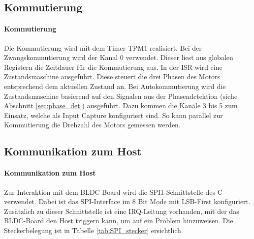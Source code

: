 \ifSTANDALONE
\subsection{Kommutierung}
\fi
\ifEMBED
\paragraph{Kommutierung}$~~$\vspace{2mm}\\
\fi
Die Kommutierung wird mit dem Timer TPM1 realisiert. Bei der 
Zwangskommutierung wird der Kanal 0 verwendet. Dieser liest aus globalen 
Registern die Zeitdauer für die Kommutierung aus. In der ISR wird eine 
Zustandsmaschine ausgeführt. Diese steuert die drei Phasen des Motors 
entsprechend dem aktuellen Zustand an. Bei Autokommutierung wird die 
Zustandsmaschine basierend auf den Signalen aus der Phasendetektion (siehe 
Abschnitt \ref{sec:phase_det}) ausgeführt. Dazu kommen die Kanäle 3 bis 5 zum 
Einsatz, welche als Input Capture konfiguriert sind. So kann parallel zur 
Kommutierung die Drehzahl des Motors gemessen werden. 

\ifSTANDALONE
\subsection{Kommunikation zum Host}
\fi
\ifEMBED
\paragraph{Kommunikation zum Host}$~~$\vspace{2mm}\\
\fi
Zur Interaktion mit dem BLDC-Board wird die SPI1-Schnittstelle des 
\si{\micro}C verwendet. Dabei ist das SPI-Interface im 8 Bit Mode mit 
LSB-First konfiguriert. Zusätzlich zu dieser Schnittstelle ist eine 
IRQ-Leitung vorhanden, mit der das BLDC-Board den Host triggern kann, um auf 
ein Problem hinzuweisen. Die Steckerbelegung ist in Tabelle 
\ref{tab:SPI_stecker} ersichtlich.

